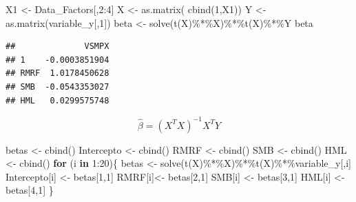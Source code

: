 \documentclass[
  12pt,
]{article}
\newenvironment{Shaded}{\begin{snugshade}}{\end{snugshade}}
\newcommand{\ControlFlowTok}[1]{\textcolor[rgb]{0.13,0.29,0.53}{\textbf{#1}}}
\newcommand{\DecValTok}[1]{\textcolor[rgb]{0.00,0.00,0.81}{#1}}
\newcommand{\FunctionTok}[1]{\textcolor[rgb]{0.00,0.00,0.00}{#1}}
\newcommand{\NormalTok}[1]{#1}
\newcommand{\OtherTok}[1]{\textcolor[rgb]{0.56,0.35,0.01}{#1}}
\newcommand{\SpecialCharTok}[1]{\textcolor[rgb]{0.00,0.00,0.00}{#1}}
\begin{document}
\begin{Shaded}
\begin{Highlighting}[]
\NormalTok{X1 }\OtherTok{\textless{}{-}}\NormalTok{ Data\_Factors[,}\DecValTok{2}\SpecialCharTok{:}\DecValTok{4}\NormalTok{]}
\NormalTok{X }\OtherTok{\textless{}{-}} \FunctionTok{as.matrix}\NormalTok{( }\FunctionTok{cbind}\NormalTok{(}\DecValTok{1}\NormalTok{,X1))}
\NormalTok{Y }\OtherTok{\textless{}{-}} \FunctionTok{as.matrix}\NormalTok{(variable\_y[,}\DecValTok{1}\NormalTok{])}
\NormalTok{beta }\OtherTok{\textless{}{-}} \FunctionTok{solve}\NormalTok{(}\FunctionTok{t}\NormalTok{(X)}\SpecialCharTok{\%*\%}\NormalTok{X)}\SpecialCharTok{\%*\%}\FunctionTok{t}\NormalTok{(X)}\SpecialCharTok{\%*\%}\NormalTok{Y}
\NormalTok{beta}
\end{Highlighting}
\end{Shaded}

\begin{verbatim}
##              VSMPX
## 1    -0.0003851904
## RMRF  1.0178450628
## SMB  -0.0543353027
## HML   0.0299575748
\end{verbatim}

\[
\hat{\beta}=(X^TX)^{-1}X^TY
\]

\begin{Shaded}
\begin{Highlighting}[]
\NormalTok{betas }\OtherTok{\textless{}{-}} \FunctionTok{cbind}\NormalTok{()}
\NormalTok{Intercepto }\OtherTok{\textless{}{-}} \FunctionTok{cbind}\NormalTok{()}
\NormalTok{RMRF }\OtherTok{\textless{}{-}} \FunctionTok{cbind}\NormalTok{()}
\NormalTok{SMB }\OtherTok{\textless{}{-}} \FunctionTok{cbind}\NormalTok{()}
\NormalTok{HML }\OtherTok{\textless{}{-}} \FunctionTok{cbind}\NormalTok{()}
\ControlFlowTok{for}\NormalTok{ (i }\ControlFlowTok{in} \DecValTok{1}\SpecialCharTok{:}\DecValTok{20}\NormalTok{)\{}
\NormalTok{  betas }\OtherTok{\textless{}{-}} \FunctionTok{solve}\NormalTok{(}\FunctionTok{t}\NormalTok{(X)}\SpecialCharTok{\%*\%}\NormalTok{X)}\SpecialCharTok{\%*\%}\FunctionTok{t}\NormalTok{(X)}\SpecialCharTok{\%*\%}\NormalTok{variable\_y[,i]}
\NormalTok{  Intercepto[i] }\OtherTok{\textless{}{-}}\NormalTok{ betas[}\DecValTok{1}\NormalTok{,}\DecValTok{1}\NormalTok{]}
\NormalTok{  RMRF[i]}\OtherTok{\textless{}{-}}\NormalTok{ betas[}\DecValTok{2}\NormalTok{,}\DecValTok{1}\NormalTok{]}
\NormalTok{  SMB[i] }\OtherTok{\textless{}{-}}\NormalTok{ betas[}\DecValTok{3}\NormalTok{,}\DecValTok{1}\NormalTok{]}
\NormalTok{  HML[i] }\OtherTok{\textless{}{-}}\NormalTok{ betas[}\DecValTok{4}\NormalTok{,}\DecValTok{1}\NormalTok{]}
\NormalTok{\}}
\end{Highlighting}
\end{Shaded}
\end{document}
